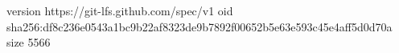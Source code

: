 version https://git-lfs.github.com/spec/v1
oid sha256:df8c236e0543a1bc9b22af8323de9b7892f00652b5e63e593c45e4aff5d0d70a
size 5566
